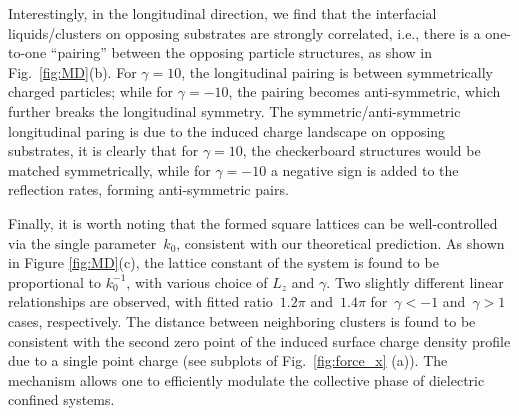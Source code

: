 Interestingly, in the longitudinal direction, we find that the interfacial liquids/clusters on opposing substrates are strongly correlated, i.e., there is a one-to-one “pairing” between the opposing particle structures, as show in Fig.~\ref{fig:MD}(b).
For $\gamma=10$, the longitudinal pairing is between symmetrically charged particles; while for $\gamma=-10$, the pairing becomes anti-symmetric, which further breaks the longitudinal symmetry. The symmetric/anti-symmetric longitudinal paring is due to the induced charge landscape on opposing substrates, it is clearly that for $\gamma=10$, the checkerboard structures would be matched symmetrically, while for $\gamma=-10$ a negative sign is added to the reflection rates, forming anti-symmetric pairs.

Finally, it is worth noting that the formed square lattices can be well-controlled via the single parameter~$k_0$, consistent with our theoretical prediction.
As shown in Figure \ref{fig:MD}(c), the lattice constant of the system is found to be proportional to $k_0^{-1}$, with various choice of $L_z$ and $\gamma$. 
Two slightly different linear relationships are observed, with fitted ratio~$1.2 \pi$ and~$1.4 \pi$ for~$\gamma < -1$ and~$\gamma > 1$ cases, respectively. 
The distance between neighboring clusters is found to be consistent with the second zero point of the induced surface charge density profile due to a single point charge (see subplots of Fig.~\ref{fig:force_x} (a)). The mechanism allows one to efficiently modulate the collective phase of dielectric confined systems.